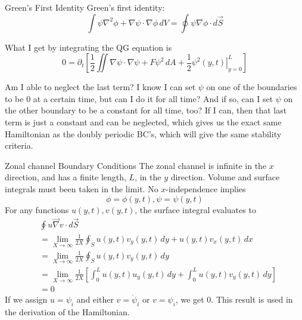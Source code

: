 \documentclass[12pt]{article}
\begin{document}
    \begin{section}{Green's First Identity}
        Green's first identity:
        $$
        \int \psi \nabla^2 \phi + \nabla \psi \cdot \nabla \phi \, dV = \oint \psi \nabla \phi \cdot d \vec S
        $$

        What I get by integrating the QG equation is
        $$
            0= \partial_t \left[ \frac12 \iint \nabla\psi\cdot\nabla\psi + F\psi^2 \, dA + \frac12 \left. \psi^2(y,t) \right|_{y=0}^L \right]
        $$

        Am I able to neglect the last term? I know I can set $\psi$ on one of the boundaries to be 0 at a certain time, but can I do it for all time? And if so, can I set $\psi$ on the other boundary to be a constant for all time, too? If I can, then that last term is just a constant and can be neglected, which gives us the exact same Hamiltonian as the doubly periodic BC's, which will give the same stability criteria.
    \end{section}

\newpage
\begin{section}{Zonal channel Boundary Conditions}
    The zonal channel is infinite in the $x$ direction, and has a finite length, $L$, in the $y$ direction. Volume and surface integrals must been taken in the limit.
    No $x$-independence implies
    $$
        \phi = \phi(y, t), \psi = \psi(y, t)
    $$
    For any functions $u(y,t), v(y,t)$, the surface integral evaluates to
    \begin{align*}
        &\oint u \vec\nabla v \cdot d\vec S \\
        &= \lim_{X \rightarrow \infty} \frac{1}{2X} \oint_S u(y,t) v_y(y,t) \, dy + u(y,t) v_x(y,t) \, dx \\
        &= \lim_{X \rightarrow \infty} \frac{1}{2X} \oint_S u(y,t) v_y(y,t) \, dy \\
        &= \lim_{X \rightarrow \infty} \frac{1}{2X} \left[ \int_0^L u(y,t)u_y(y,t) \, dy + \int_0^L u(y,t)v_y(y,t) \, dy \right] \\
        &= 0
    \end{align*}
    If we assign $u = \psi_i$ and either $v = \dot\psi_i$ or $v = \psi_i$, we get 0. This result is used in the derivation of the Hamiltonian.
\end{section}
\end{document}
